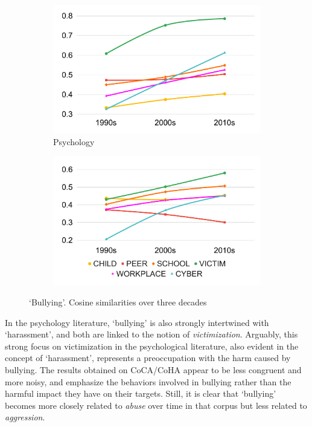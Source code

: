 \documentclass[output=paper]{langsci/langscibook}
\begin{document}
\begin{figure}[H]
  \begin{subfigure}[b]{.5\linewidth}
        \includegraphics[width=\textwidth]{figures/VYLOMOVA_bullying-psych.pdf}
        \caption{Psychology}
  \end{subfigure}\begin{subfigure}[b]{.5\linewidth}
        \includegraphics[width=\textwidth]{figures/VYLOMOVA_bullying-coca.pdf}
  \end{subfigure}
 \caption{`Bullying'. Cosine similarities over three decades\label{fig:w2v-cos-sim-bullying}}
\end{figure}

\begin{sloppypar}
In the psychology literature, `bullying' is also strongly intertwined with `harassment', and both are linked to the notion of \textit{victimization}. Arguably, this strong focus on victimization in the psychological literature, also evident in the concept of `harassment', represents a preoccupation with the harm caused by bullying. The results obtained on CoCA/CoHA appear to be less congruent and more noisy, and emphasize the behaviors involved in bullying rather than the harmful impact they have on their targets. Still, it is clear that `bullying' becomes more closely related to \textit{abuse} over time in that corpus but less related to \textit{aggression}.
\end{sloppypar}
\end{document}
